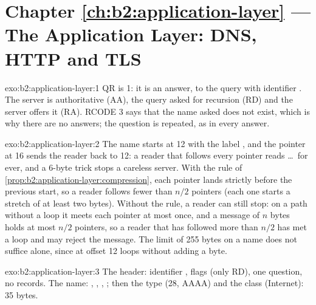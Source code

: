\section*{Chapter \ref{ch:b2:application-layer} --- The Application Layer: DNS, HTTP and TLS}

\begin{solution}{exo:b2:application-layer:1}
QR is 1: it is an answer, to the query with identifier . The server is authoritative (AA), the query asked
for recursion (RD) and the server offers it (RA). RCODE 3 says that the name asked does not exist, which is why there
are no answers; the question is repeated, as in every answer.
\end{solution}

\begin{solution}{exo:b2:application-layer:2}
The name starts at 12 with the label , and the pointer at 16 sends the reader back to 12: a reader that
follows every pointer reads \dots\ for ever, and a 6-byte trick stops a careless server. With the
rule of \cref{prop:b2:application-layer:compression}, each pointer lands strictly before the previous start, so a
reader follows fewer than $n/2$ pointers (each one starts a stretch of at least two bytes). Without the rule, a reader
can still stop: on a path without a loop it meets each pointer at most once, and a message of $n$ bytes holds at most
$n/2$ pointers, so a reader that has followed more than $n/2$ has met a loop and may reject the message. The limit of
255 bytes on a name does not suffice alone, since  at offset 12 loops without adding a byte.
\end{solution}

\begin{solution}{exo:b2:application-layer:3}
The header: identifier , flags  (only RD), one question, no records. The name: 
,  ,  , ; then the type  (28, AAAA) and the
class  (Internet): 35 bytes.
\end{solution}

